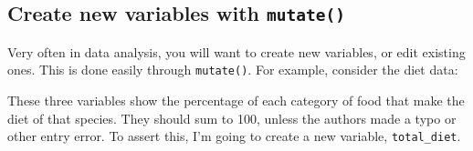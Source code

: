 \documentclass[]{book}
\newenvironment{Shaded}{}{}
\newcommand{\CommentTok}[1]{\textcolor[rgb]{0.38,0.63,0.69}{\textit{#1}}}
\newcommand{\KeywordTok}[1]{\textcolor[rgb]{0.00,0.44,0.13}{\textbf{#1}}}
\newcommand{\NormalTok}[1]{#1}
\newcommand{\OperatorTok}[1]{\textcolor[rgb]{0.40,0.40,0.40}{#1}}
\newcommand{\StringTok}[1]{\textcolor[rgb]{0.25,0.44,0.63}{#1}}
\begin{document}
\hypertarget{create-new-variables-with-mutate}{%
\subsection{\texorpdfstring{Create new variables with \texttt{mutate()}}{Create new variables with mutate()}}\label{create-new-variables-with-mutate}}

Very often in data analysis, you will want to create new variables, or edit
existing ones. This is done easily through \texttt{mutate()}. For example, consider
the diet data:

\begin{Shaded}
\end{Shaded}

These three variables show the percentage of each category of food that make the
diet of that species. They should sum to 100, unless the authors made a typo or
other entry error. To assert this, I'm going to create a new variable,
\texttt{total\_diet}.
\end{document}
